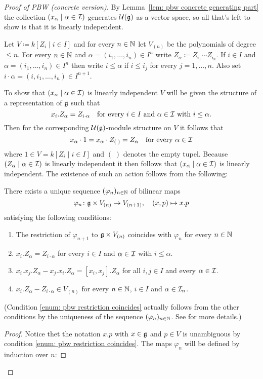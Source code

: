 \begin{proof}[Proof of PBW (concrete version)]
 By Lemma~\ref{lem: pbw concrete generating part} the collection $(x_\alpha \mid \alpha \in \mathcal{I})$ generates $\mathcal{U}(\mathfrak{g})$ as a vector space, so all that’s left to show is that it is linearly independent.
 
 Let $V \coloneqq k[Z_i \mid i \in I]$ and for every $n \in \mathbb{N}$ let $V_{(n)}$ be the polynomials of degree $\leq n$. For every $n \in \mathbb{N}$ and $\alpha = (i_1, \dotsc, i_n) \in I^n$ write $Z_\alpha \coloneqq Z_{i_1} \dotsm Z_{i_n}$. If $i \in I$ and $\alpha = (i_1, \dotsc, i_n) \in I^n$ then write $i \leq \alpha$ if $i \leq i_j$ for every $j = 1, \dotsc, n$. Also set $i \cdot \alpha = (i, i_1, \dotsc, i_n) \in I^{n+1}$.
 
 To show that $(x_\alpha \mid \alpha \in \mathcal{I})$ is linearly independent $V$ will be given the structure of a representation of $\mathfrak{g}$ such that
 \[
  x_i.Z_\alpha = Z_{i \cdot \alpha}
  \quad \text{for every $i \in I$ and $\alpha \in \mathcal{I}$ with $i \leq \alpha$}.
 \]
 Then for the corresponding $\mathcal{U}(\mathfrak{g})$-module structure on $V$ it follows that
 \[
  x_\alpha \cdot 1
  = x_\alpha \cdot Z_{(\;)}
  = Z_\alpha
  \quad \text{for every $\alpha \in \mathcal{I}$}
 \]
 where $1 \in V = k[Z_i \mid i \in I]$ and $(\;)$ denotes the empty tupel. Because $(Z_\alpha \mid \alpha \in \mathcal{I})$ is linearly independent it then follows that $(x_\alpha \mid \alpha \in \mathcal{I})$ is linearly independent. The existence of such an action follows from the following:
 
 \begin{claim*}
  There exists a unique sequence $(\varphi_n)_{n \in \mathbb{N}}$ of bilinear maps
  \[
   \varphi_n \colon \mathfrak{g} \times V_{(n)} \to V_{(n+1)}, \quad (x,p) \mapsto x.p
  \]
  satisfying the following conditions:
  \begin{enumerate}
   \item\label{enum: pbw restriction coincides}
    The restriction of $\varphi_{n+1}$ to $\mathfrak{g} \times V_{(n)}$ coincides with $\varphi_n$ for every $n \in \mathbb{N}$
   \item\label{enum: pbw essential condition}
    $x_i.Z_\alpha = Z_{i \cdot \alpha}$ for every $i \in I$ and $\alpha \in \mathcal{I}$ with $i \leq \alpha$.
   \item\label{enum: pbw representation of lie algebra}
    $x_i.x_j.Z_\alpha - x_j.x_i.Z_\alpha = [x_i, x_j].Z_\alpha$ for all $i,j \in I$ and every $\alpha \in \mathcal{I}$.
   \item\label{enum: pbw technical detail for construction}
    $x_i.Z_\alpha - Z_{i \cdot \alpha} \in V_{(n)}$ for every $n \in \mathbb{N}$, $i \in I$ and $\alpha \in \mathcal{I}_n$.
   \end{enumerate}
   (Condition \ref{enum: pbw restriction coincides} actually follows from the other conditions by the uniqueness of the sequence $(\varphi_n)_{n \in \mathbb{N}}$. See \cite[\S 17.4]{Humphreys} for more details.)
 \end{claim*}
 \begin{proof}
  Notice thet the notation $x.p$ with $x \in \mathfrak{g}$ and $p \in V$ is unambiguous by condition \ref{enum: pbw restriction coincides}. The maps $\varphi_n$ will be defined by induction over $n$:
  

\end{proof}
\end{proof}
